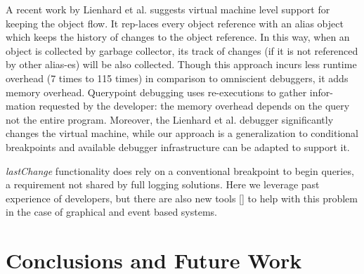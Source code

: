 \documentclass[preprint]{sigplanconf}
\begin{document}
A recent work by Lienhard et al.\cite{Lienhard} suggests virtual
machine level support for keeping the object flow. It rep-laces every
object reference with an alias object which keeps the history of
changes to the object reference. In this way, when an object is
collected by garbage collector, its track of changes (if it is not
referenced by other alias-es) will be also collected. Though this
approach incurs less runtime overhead (7 times to 115 times) in
comparison to omniscient debuggers, it adds memory
overhead. Querypoint debugging uses re-executions to gather
infor-mation requested by the developer: the memory overhead depends
on the query not the entire program. Moreover, the Lienhard et
al. debugger significantly changes the virtual machine, while our
approach is a generalization to conditional breakpoints and available
debugger infrastructure can be adapted to support it.
 
\textit{lastChange} functionality does rely on a conventional
breakpoint to begin queries, a requirement not shared by full logging
solutions.  Here we leverage past experience of developers, but there
are also new tools [] to help with this problem in the case of
graphical and event based systems.


\section{Conclusions and Future Work}






\end{document}
